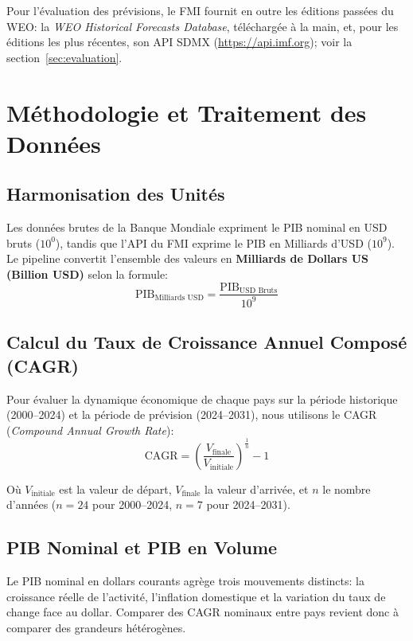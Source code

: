 \documentclass[11pt,a4paper]{article}
\begin{document}
Pour l'évaluation des prévisions, le FMI fournit en outre les éditions passées du WEO: la \textit{WEO Historical Forecasts Database}, téléchargée à la main, et, pour les éditions les plus récentes, son API SDMX (\url{https://api.imf.org}); voir la section~\ref{sec:evaluation}.

\section{Méthodologie et Traitement des Données}

\subsection{Harmonisation des Unités}
Les données brutes de la Banque Mondiale expriment le PIB nominal en USD bruts ($10^0$), tandis que l'API du FMI exprime le PIB en Milliards d'USD ($10^9$). Le pipeline convertit l'ensemble des valeurs en \textbf{Milliards de Dollars US (Billion USD)} selon la formule:
\begin{equation}
\text{PIB}_{\text{Milliards USD}} = \frac{\text{PIB}_{\text{USD Bruts}}}{10^9}
\end{equation}

\subsection{Calcul du Taux de Croissance Annuel Composé (CAGR)}
Pour évaluer la dynamique économique de chaque pays sur la période historique (2000--2024) et la période de prévision (2024--2031), nous utilisons le CAGR (\textit{Compound Annual Growth Rate}):
\begin{equation}
\text{CAGR} = \left( \frac{V_{\text{finale}}}{V_{\text{initiale}}} \right)^{\frac{1}{n}} - 1
\end{equation}

Où $V_{\text{initiale}}$ est la valeur de départ, $V_{\text{finale}}$ la valeur d'arrivée, et $n$ le nombre d'années ($n = 24$ pour 2000--2024, $n = 7$ pour 2024--2031).

\subsection{PIB Nominal et PIB en Volume}
Le PIB nominal en dollars courants agrège trois mouvements distincts: la croissance réelle de l'activité, l'inflation domestique et la variation du taux de change face au dollar. Comparer des CAGR nominaux entre pays revient donc à comparer des grandeurs hétérogènes.
\end{document}
